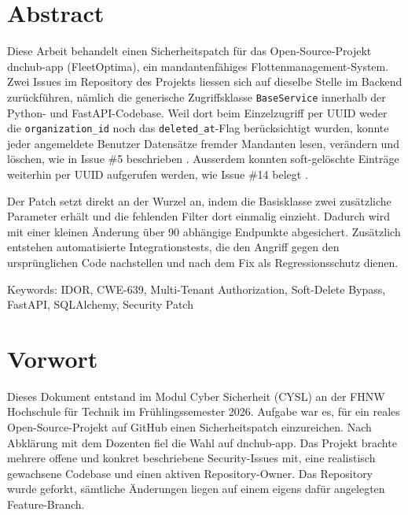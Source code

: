 \section*{Abstract}

Diese Arbeit behandelt einen Sicherheitspatch für das Open-Source-Projekt
dnchub-app (FleetOptima), ein mandantenfähiges Flottenmanagement-System.
Zwei Issues im Repository des Projekts liessen sich auf dieselbe Stelle
im Backend zurückführen, nämlich die generische Zugriffsklasse
\texttt{BaseService} innerhalb der Python- und FastAPI-Codebase. Weil dort
beim Einzelzugriff per UUID weder die \texttt{organiza\-tion\_id} noch
das \texttt{deleted\_at}-Flag berücksichtigt wurden, konnte jeder
angemeldete Benutzer Datensätze fremder Mandanten lesen, verändern und
löschen, wie in Issue \#5 beschrieben \parencite{github_issue_5}.
Ausserdem konnten soft-gelöschte Einträge weiterhin per UUID
aufgerufen werden, wie Issue \#14 belegt \parencite{github_issue_14}.

Der Patch setzt direkt an der Wurzel an, indem die Basisklasse zwei
zusätzliche Parameter erhält und die fehlenden Filter dort einmalig
einzieht. Dadurch wird mit einer kleinen Änderung über 90 abhängige
Endpunkte abgesichert. Zusätzlich entstehen automatisierte Integrationstests,
die den Angriff gegen den ursprünglichen Code nachstellen und nach dem
Fix als Regressionsschutz dienen.

\vspace{2ex}

\noindent Keywords: IDOR, CWE-639, Multi-Tenant Authorization,
Soft-Delete Bypass, FastAPI, SQLAlchemy, Security Patch

\clearpage

\section*{Vorwort}

Dieses Dokument entstand im Modul Cyber Sicherheit (CYSL) an der FHNW
Hochschule für Technik im Frühlingssemester 2026. Aufgabe war es, für ein
reales Open-Source-Projekt auf GitHub einen
Sicherheitspatch einzureichen. Nach Abklärung mit dem Dozenten fiel
die Wahl auf dnchub-app. Das Projekt brachte mehrere offene und
konkret beschriebene Security-Issues mit, eine realistisch gewachsene
Codebase und einen aktiven Repository-Owner. Das Repository wurde
geforkt, sämtliche Änderungen liegen auf einem eigens dafür angelegten
Feature-Branch.

